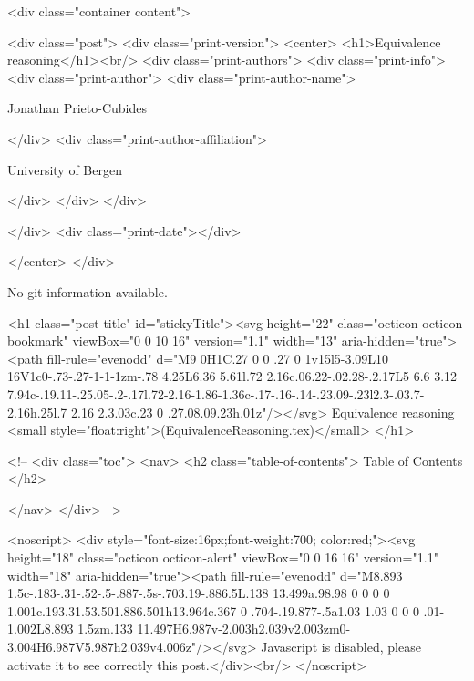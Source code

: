       <div class="container content">
        







<div class="post">
  <div class="print-version">
    <center>
      <h1>Equivalence reasoning</h1><br/>
        <div class="print-authors">
          <div class="print-info">
            <div class="print-author">
              <div class="print-author-name">
                
                  Jonathan Prieto-Cubides
                
              </div>
              <div class="print-author-affiliation">
                
                  University of Bergen
                
                </div>
            </div>
          </div>
          
          
        </div>
        <div class="print-date"></div>
        
        
    </center>
  </div>

  
  No git information available.
  

  <h1 class="post-title" id="stickyTitle"><svg height="22" class="octicon octicon-bookmark" viewBox="0 0 10 16" version="1.1" width="13" aria-hidden="true"><path fill-rule="evenodd" d="M9 0H1C.27 0 0 .27 0 1v15l5-3.09L10 16V1c0-.73-.27-1-1-1zm-.78 4.25L6.36 5.61l.72 2.16c.06.22-.02.28-.2.17L5 6.6 3.12 7.94c-.19.11-.25.05-.2-.17l.72-2.16-1.86-1.36c-.17-.16-.14-.23.09-.23l2.3-.03.7-2.16h.25l.7 2.16 2.3.03c.23 0 .27.08.09.23h.01z"/></svg> Equivalence reasoning <small style="float:right">(EquivalenceReasoning.tex)</small>
  </h1>

  <!-- 
  <div class="toc">
    <nav>
    <h2 class="table-of-contents"> Table of Contents </h2>
      

    </nav>
  </div>
   -->

  <noscript>
  <div style="font-size:16px;font-weight:700; color:red;"><svg height="18" class="octicon octicon-alert" viewBox="0 0 16 16" version="1.1" width="18" aria-hidden="true"><path fill-rule="evenodd" d="M8.893 1.5c-.183-.31-.52-.5-.887-.5s-.703.19-.886.5L.138 13.499a.98.98 0 0 0 0 1.001c.193.31.53.501.886.501h13.964c.367 0 .704-.19.877-.5a1.03 1.03 0 0 0 .01-1.002L8.893 1.5zm.133 11.497H6.987v-2.003h2.039v2.003zm0-3.004H6.987V5.987h2.039v4.006z"/></svg> Javascript is disabled, please activate it to see correctly this post.</div><br/>
  </noscript>

